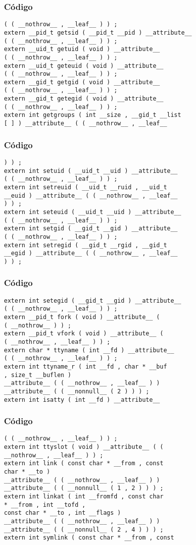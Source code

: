 \documentclass{beamer}
\begin{document}
\begin{frame}[fragile]
\frametitle{C\'odigo}
\begin{verbatim}
( ( __nothrow__ , __leaf__ ) ) ; 
extern __pid_t getsid ( __pid_t __pid ) __attribute__ 
( ( __nothrow__ , __leaf__ ) ) ; 
extern __uid_t getuid ( void ) __attribute__ 
( ( __nothrow__ , __leaf__ ) ) ; 
extern __uid_t geteuid ( void ) __attribute__ 
( ( __nothrow__ , __leaf__ ) ) ; 
extern __gid_t getgid ( void ) __attribute__ 
( ( __nothrow__ , __leaf__ ) ) ; 
extern __gid_t getegid ( void ) __attribute__ 
( ( __nothrow__ , __leaf__ ) ) ; 
extern int getgroups ( int __size , __gid_t __list 
[ ] ) __attribute__ ( ( __nothrow__ , __leaf__ 
\end{verbatim}
\end{frame}
\begin{frame}[fragile]
\frametitle{C\'odigo}
\begin{verbatim}
) ) ; 
extern int setuid ( __uid_t __uid ) __attribute__ 
( ( __nothrow__ , __leaf__ ) ) ; 
extern int setreuid ( __uid_t __ruid , __uid_t 
__euid ) __attribute__ ( ( __nothrow__ , __leaf__ 
) ) ; 
extern int seteuid ( __uid_t __uid ) __attribute__ 
( ( __nothrow__ , __leaf__ ) ) ; 
extern int setgid ( __gid_t __gid ) __attribute__ 
( ( __nothrow__ , __leaf__ ) ) ; 
extern int setregid ( __gid_t __rgid , __gid_t 
__egid ) __attribute__ ( ( __nothrow__ , __leaf__ 
) ) ; 
\end{verbatim}
\end{frame}
\begin{frame}[fragile]
\frametitle{C\'odigo}
\begin{verbatim}
extern int setegid ( __gid_t __gid ) __attribute__ 
( ( __nothrow__ , __leaf__ ) ) ; 
extern __pid_t fork ( void ) __attribute__ ( 
( __nothrow__ ) ) ; 
extern __pid_t vfork ( void ) __attribute__ ( 
( __nothrow__ , __leaf__ ) ) ; 
extern char * ttyname ( int __fd ) __attribute__ 
( ( __nothrow__ , __leaf__ ) ) ; 
extern int ttyname_r ( int __fd , char * __buf 
, size_t __buflen ) 
__attribute__ ( ( __nothrow__ , __leaf__ ) ) 
__attribute__ ( ( __nonnull__ ( 2 ) ) ) ; 
extern int isatty ( int __fd ) __attribute__ 
\end{verbatim}
\end{frame}
\begin{frame}[fragile]
\frametitle{C\'odigo}
\begin{verbatim}
( ( __nothrow__ , __leaf__ ) ) ; 
extern int ttyslot ( void ) __attribute__ ( ( 
__nothrow__ , __leaf__ ) ) ; 
extern int link ( const char * __from , const 
char * __to ) 
__attribute__ ( ( __nothrow__ , __leaf__ ) ) 
__attribute__ ( ( __nonnull__ ( 1 , 2 ) ) ) ; 
extern int linkat ( int __fromfd , const char 
* __from , int __tofd , 
const char * __to , int __flags ) 
__attribute__ ( ( __nothrow__ , __leaf__ ) ) 
__attribute__ ( ( __nonnull__ ( 2 , 4 ) ) ) ; 
extern int symlink ( const char * __from , const 
\end{verbatim}
\end{frame}
\end{document}

